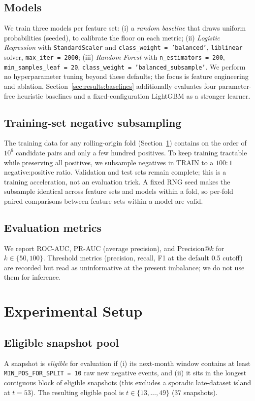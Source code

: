 \documentclass[conference]{IEEEtran}
\newcommand{\code}[1]{\texttt{#1}}
\begin{document}
\subsection{Models}
We train three models per feature set: (i) a \emph{random baseline}
that draws uniform probabilities (seeded), to calibrate the floor on
each metric; (ii) \emph{Logistic Regression} with \code{StandardScaler}
and \code{class\_weight = 'balanced'}, \code{liblinear} solver,
\code{max\_iter = 2000}; (iii) \emph{Random Forest} with
\code{n\_estimators = 200}, \code{min\_samples\_leaf = 20},
\code{class\_weight = 'balanced\_subsample'}. We perform no
hyperparameter tuning beyond these defaults; the focus is feature
engineering and ablation. Section~\ref{sec:results:baselines}
additionally evaluates four parameter-free heuristic baselines and a
fixed-configuration LightGBM as a stronger learner.

\subsection{Training-set negative subsampling}
The training data for any rolling-origin fold (Section~\ref{sec:setup})
contains on the order of $10^{6}$ candidate pairs and only a few
hundred positives. To keep training tractable while preserving all
positives, we subsample negatives in TRAIN to a $100{:}1$
negative:positive ratio. Validation and test sets remain complete;
this is a training acceleration, not an evaluation trick. A fixed
RNG seed makes the subsample identical across feature sets and models
within a fold, so per-fold paired comparisons between feature sets
within a model are valid.

\subsection{Evaluation metrics}
We report ROC-AUC, PR-AUC (average precision), and Precision@$k$ for
$k \in \{50, 100\}$. Threshold metrics (precision, recall, F1 at the
default 0.5 cutoff) are recorded but read as uninformative at the
present imbalance; we do not use them for inference.

\section{Experimental Setup}\label{sec:setup}

\subsection{Eligible snapshot pool}
A snapshot is \emph{eligible} for evaluation if (i) its next-month
window contains at least \code{MIN\_POS\_FOR\_SPLIT = 10} raw new
negative events, and (ii) it sits in the longest contiguous block of
eligible snapshots (this excludes a sporadic late-dataset island at
$t = 53$). The resulting eligible pool is $t \in \{13, \dots, 49\}$
(37 snapshots).
\end{document}
